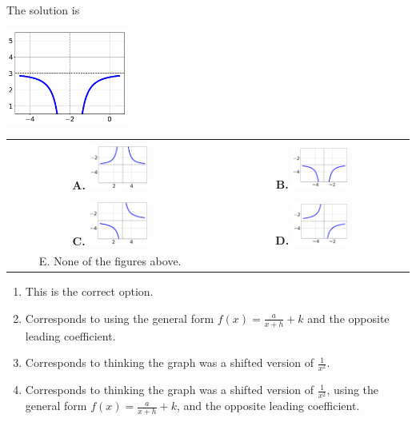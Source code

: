 \documentclass{extbook}[14pt]
\begin{document}
 
 The solution is  
 \begin{center} \includegraphics[width=0.3\textwidth]{../Figures/rationalEquationToGraphCD.png} \end{center}\begin{tabular}{|c|c|} 
\hline 
 & \tabularnewline 
 \textbf{A.} \includegraphics[width=0.3\textwidth]{../Figures/rationalEquationToGraphAC.png} & \textbf{B.} \includegraphics[width=0.3\textwidth]{../Figures/rationalEquationToGraphBC.png} \tabularnewline 
\hline 
 & \tabularnewline 
 \textbf{C.} \includegraphics[width=0.3\textwidth]{../Figures/rationalEquationToGraphCC.png} & \textbf{D.} \includegraphics[width=0.3\textwidth]{../Figures/rationalEquationToGraphDC.png} \tabularnewline 
\hline 
 E. None of the figures above. & \tabularnewline 
\hline 
 \end{tabular} 
 
\begin{enumerate}[label=\Alph*.] 
\item This is the correct option.  
\item Corresponds to using the general form $f(x) = \frac{a}{x+h}+k$ and the opposite leading coefficient.  
\item Corresponds to thinking the graph was a shifted version of $\frac{1}{x^2}$.  
\item Corresponds to thinking the graph was a shifted version of $\frac{1}{x^2}$, using the general form $f(x) = \frac{a}{x+h}+k$, and the opposite leading coefficient.  
\end{enumerate} 
 
\end{document}
